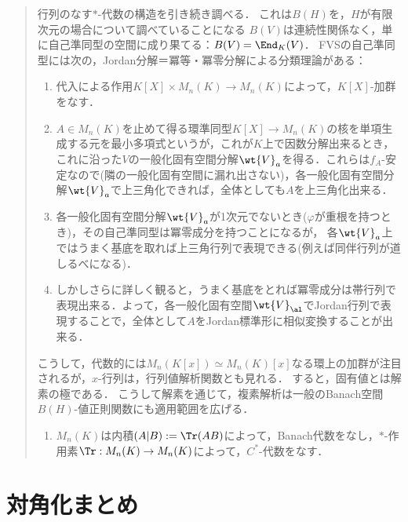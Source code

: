 \documentclass[uplatex, dvipdfmx]{jsreport}
\begin{document}
\begin{quotation}
    行列のなす$*$-代数の構造を引き続き調べる．
    これは$B(H)$を，$H$が有限次元の場合について調べていることになる
    $B(V)$は連続性関係なく，単に自己準同型の空間に成り果てる：$B(V)=\End_K(V)$．
    FVSの自己準同型には次の，Jordan分解＝冪等・冪零分解による分類理論がある：
    \begin{enumerate}
        \item 代入による作用$K[X]\times M_n(K)\to M_n(K)$によって，$K[X]$-加群をなす．
        \item $A\in M_n(K)$を止めて得る環準同型$K[X]\to M_n(K)$の核を単項生成する元を最小多項式というが，これが$K$上で因数分解出来るとき，これに沿った$V$の一般化固有空間分解$\wt{V}_a$を得る．これらは$f_A$-安定なので(隣の一般化固有空間に漏れ出さない)，各一般化固有空間分解$\wt{V}_a$で上三角化できれば，全体としても$A$を上三角化出来る．
        \item 各一般化固有空間分解$\wt{V}_a$が1次元でないとき($\varphi$が重根を持つとき)，その自己準同型は冪零成分を持つことになるが，
        各$\wt{V}_a$上ではうまく基底を取れば上三角行列で表現できる(例えば同伴行列が道しるべになる)．
        \item しかしさらに詳しく観ると，うまく基底をとれば冪零成分は帯行列で表現出来る．よって，各一般化固有空間$\wt{V}_\al$でJordan行列で表現することで，全体として$A$をJordan標準形に相似変換することが出来る．
    \end{enumerate}
    こうして，代数的には$M_n(K[x])\simeq M_n(K)[x]$なる環上の加群が注目されるが，$x$-行列は，行列値解析関数とも見れる．
    すると，固有値とは解素の極である．
    こうして解素を通じて，複素解析は一般のBanach空間$B(H)$-値正則関数にも適用範囲を広げる．
    \begin{enumerate}
        \item $M_n(K)$は内積$(A|B):=\Tr(AB)$によって，Banach代数をなし，$*$-作用素$\Tr:M_n(K)\to M_n(K)$によって，$C^*$-代数をなす．
    \end{enumerate}
\end{quotation}

\section{対角化まとめ}
\end{document}
